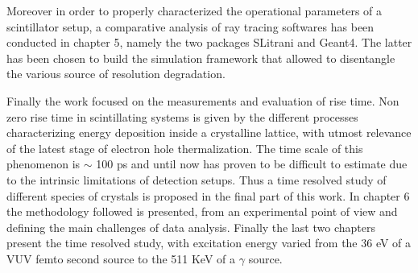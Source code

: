 Moreover in order to properly characterized the operational parameters of a scintillator setup, a comparative analysis of ray tracing softwares has been conducted in chapter 5, namely the two packages SLitrani and Geant4. The latter has been chosen to build the simulation framework that allowed to disentangle the various source of resolution degradation.

Finally the work focused on the measurements and evaluation of rise time. Non zero rise time in scintillating systems is given by the different processes characterizing energy deposition inside a crystalline lattice, with utmost relevance of the latest stage of electron hole thermalization. The time scale of this phenomenon is $\sim$ 100 ps and until now has proven to be difficult to estimate due to the intrinsic limitations of detection setups.
Thus a time resolved study of different species of crystals is proposed in the final part of this work.
In chapter 6 the methodology followed is presented, from an experimental point of view and defining the main challenges of data analysis.
Finally the last two chapters present the time resolved study, with excitation energy varied from the 36 eV of a VUV femto second source to the 511 KeV of a $\gamma$ source. 




